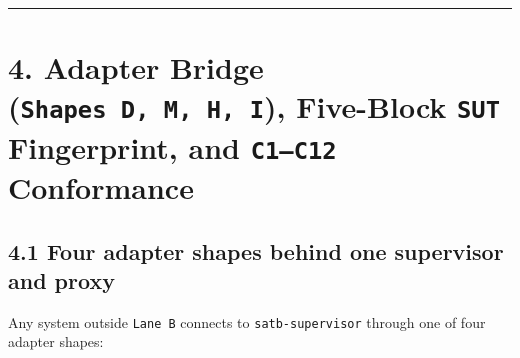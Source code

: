 \documentclass[10pt,letterpaper]{article}
\begin{document}
\begin{center}\rule{0.5\linewidth}{0.5pt}\end{center}

\section{\texorpdfstring{4. Adapter Bridge
(\texttt{Shapes\ D,\allowbreak{}\ M,\allowbreak{}\ H,\allowbreak{}\ I}), Five-Block \texttt{SUT} Fingerprint,
and \texttt{C1–C12}
Conformance}{4. Adapter Bridge (Shapes D, M, H, I), Five-Block SUT Fingerprint, and C1--C12 Conformance}}\label{adapter-bridge-shapes-d-m-h-i-five-block-sut-fingerprint-and-c1c12-conformance}

\subsection{4.1 Four adapter shapes behind one supervisor and
proxy}\label{four-adapter-shapes-behind-one-supervisor-and-proxy}

Any system outside \texttt{Lane\ B} connects to \texttt{satb-\allowbreak{}supervisor}
through one of four adapter shapes:
\end{document}
